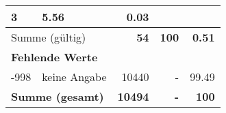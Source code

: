 \begin{longtable}{lXrrr}
       \num{3} &
       \num[round-mode=places,round-precision=2]{5.56} &
         \num[round-mode=places,round-precision=2]{0.03} \\
     \midrule
     \multicolumn{2}{l}{Summe (gültig)} &
       \textbf{\num{54}} &
     \textbf{\num{100}} &
       \textbf{\num[round-mode=places,round-precision=2]{0.51}} \\
     \multicolumn{5}{l}{\textbf{Fehlende Werte}}\\
       -998 &
       keine Angabe &
         \num{10440} &
        - &
         \num[round-mode=places,round-precision=2]{99.49} \\
     \midrule
     \multicolumn{2}{l}{\textbf{Summe (gesamt)}} &
          \textbf{\num{10494}} &
        \textbf{-} &
        \textbf{\num{100}} \\
     \bottomrule
     \end{longtable}
     
